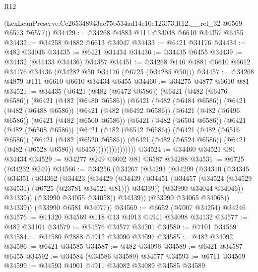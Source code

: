 \begin{lexlean}{R12}
\begin{coremodule}
      (LexLeanPreserve.Cc265348943ac75b534ad14c10e123f73.R12.__rel_32 @6569 @6573 @6577))
@34429 := @34268 @4883 @111 @34048 @6610 @34357 @6455
@34432 := @34258 @4882 @6613 @34047
@34433 := @6421 @34176
@34434 := @482 @34046
@34435 := @6421 @34434
@34436 := @34435 @6455
@34439 := @34432 (@34433 @34436) @34357
@34451 := @34268 @146 @4881 @6610 @6612 @34176 @34436 (@34282 @50 @34176 (@6725 (@34285 @50)))
@34457 := @34268 @4879 @111 @6610 @6610 @34434 @6455
@34460 := @34275 @4877 @6610 @81
@34521 := @34435
    (@6421
      (@482 (@6472 @6586))
      (@6421
        (@482 (@6476 @6586))
        (@6421
          (@482 (@6480 @6586))
          (@6421
            (@482 (@6484 @6586))
            (@6421
              (@482 (@6488 @6586))
              (@6421
                (@482 (@6492 @6586))
                (@6421
                  (@482 (@6496 @6586))
                  (@6421
                    (@482 (@6500 @6586))
                    (@6421
                      (@482 (@6504 @6586))
                      (@6421
                        (@482 (@6508 @6586))
                        (@6421
                          (@482 (@6512 @6586))
                          (@6421
                            (@482 (@6516 @6586))
                            (@6421
                              (@482 (@6520 @6586))
                              (@6421
                                (@482 (@6524 @6586))
                                (@6421 (@482 (@6528 @6586)) @6455)))))))))))))))
@34524 := @34460 @34521 @81 @34434
@34529 := @34277 @249 @6602 @81 @6587 @34288
@34531 := @6725 (@34232 @249)
@34566 := @34256
    (@34267
      (@34293
        (@34299
          (@34310
            (@34345
              (@34351
                (@34362
                  (@34423
                    (@34429
                      (@34439
                        (@34451
                          (@34457 (@34524 (@34529 @34531) (@6725 (@23781 @34521 @81))) @34339))
                        (@33990 @34044 @34046))
                      @34339))
                  (@33990 @34055 @34058))
                @34339))
            (@33990 @34065 @34068))
          @34339))
      (@33990 @6581 @34077))
@34569 := @6652 (@7007 @34254) @34246
@34576 := @11320 @34569 @118 @13 @4913 @4941 @34098 @34132
@34577 := @482 @34104
@34579 := @34576 @34577 @34201
@34580 := @7101 @34569
@34584 := @34580 @2888 @4912 @34090 @34097
@34585 := @482 @34092
@34586 := @6421 @34585
@34587 := @482 @34096
@34589 := @6421 @34587 @6455
@34592 := @34584 (@34586 @34589) @34577
@34593 := @6711 @34569
@34599 := @34593 @4901 @4911 @34082 @34089 @34585 @34589

\end{coremodule}
\end{lexlean}
